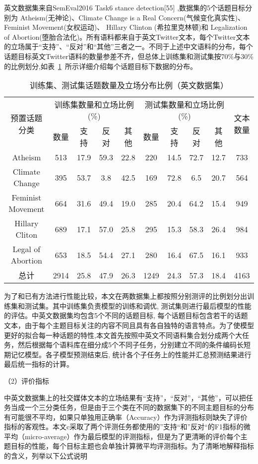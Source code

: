英文数据集来自SemEval2016 Task6 stance detection[55] ,数据集的5个话题目标分别为 Atheism(无神论)、Climate Change is a Real Concern(气候变化真实性)、Feminist Movement(女权运动)、 Hillary Clinton (希拉里克林顿)和
Legalization of Abortion(堕胎合法化)。所有语料都来自于英文Twitter文本，每个Twitter文本的立场属于“支持”、“反对”和“其他”三者之一。不同于上述中文语料的分布，每个话题目标英文Twitter语料的数量参差不齐，但总体上训练集和测试集按70\%与30\%的比例划分,如表~\ref{englishdata}~所示详细介绍每个话题目标下数据的分布。


\begin{table}[htbp]
	\caption[table123]{训练集、测试集话题数量及立场分布比例（英文数据集）}
	\label{englishdata}
	\vspace{0.5em}\centering\wuhao
	\begin{tabular}{cccccccccc}
		\toprule[1.5pt]
		\multirow{2}{*}{预置话题分类}& \multicolumn{4}{c}{训练集数量和立场比例(\%)} 
		& \multicolumn{4}{c}{测试集数量和立场比例(\%)}  &\multirow{2}{*}{文本数量}\\
		\cline{2-9}
		\quad&数量& 支持&反对&其他&数量& 支持&反对&其他 \\
		\midrule[1pt]
		Atheism&513&17.9&59.3&22.8&220&14.5&72.7&12.7&733\\
		Climate Change&395&53.7&3.8&42.5&169&72.8&6.5&20.7&564\\
		Feminist Movement&664&31.6&49.4&19.0&285&20.4&64.2&15.4&949\\
		Hillary Cliton&689&17.1&57.0&25.8&295&15.3&58.3&26.4&984\\
		Legal of Abortion&653&18.5&54.4&27.1&280&16.4&67.5&16.1&933\\
		总计&2914&25.8&47.9&26.3&1249&24.3&57.3&18.4&4163\\
		\bottomrule[1.5pt]
	\end{tabular}
\end{table}

为了和已有方法进行性能比较，本文在两数据集上都按照分别测评的比例划分出训练集和测试集。其中训练集负责模型的训练和调优, 测试集则进行最后模型的性能的评估。中英文数据集均包含5个不同的话题目标, 每个话题目标包含若干的话题文本，由于每个主题目标关注的内容不同且具有各自独特的语言特点。为了使模型更好的拟合每一种话题的特性,本文首先按照中英文不同语料集合划分成两个大任务，然后根据每个语料库在细分成5个不同子任务，分别建立不同的条件编码长短期记忆模型。各子模型预测结束后, 统计各个子任务上的性能并汇总预测结果进行最后统一指标的计算。

（2）评价指标

中英文数据集上的社交媒体文本的立场结果有“支持”，“反对”，“其他”，可以把任务当成一个三分类任务，但是由于三个类在不同的数据集下的不同主题目标的分布有可能很不平均，如果只单独用正确率（Accuracy）作为评测指标则缺失了评价指标的客观性。本文c采取了两个评测任务都使用的”支持“和”反对“的F1指标的微平均（micro-average）作为最后模型的评测指标，但是为了更清晰的评价每个主题目标的性能，每个目标主题也会单独计算微平均评测指标。为了清晰地解释指标的含义，列举以下公式说明

